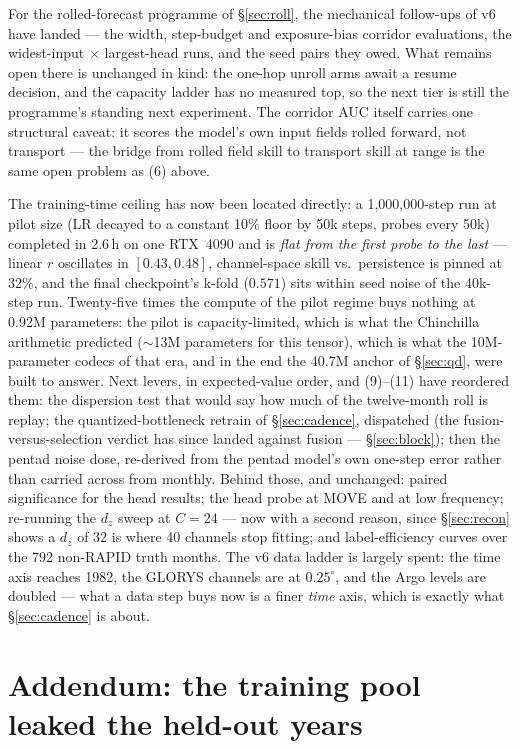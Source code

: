 \documentclass[10pt]{article}
\begin{document}
For the rolled-forecast programme of \S\ref{sec:roll}, the mechanical
follow-ups of v6 have landed --- the width, step-budget and exposure-bias
corridor evaluations, the widest-input $\times$ largest-head runs, and the
seed pairs they owed. What remains open there is unchanged in kind: the
one-hop unroll arms await a resume decision, and the capacity ladder has no
measured top, so the next tier is still the programme's standing next
experiment. The corridor AUC itself carries
one structural caveat: it scores the model's own input fields rolled
forward, not transport --- the bridge from rolled field skill to
transport skill at range is the same open problem as (6) above.

The training-time ceiling has now been located directly: a
1,000,000-step run at pilot size (LR decayed to a constant 10\% floor by
50k steps, probes every 50k) completed in 2.6\,h on one RTX~4090 and is
\emph{flat from the first probe to the last} --- linear $r$ oscillates
in $[0.43, 0.48]$, channel-space skill vs.\ persistence is pinned at
$32\%$, and the final checkpoint's k-fold ($0.571$) sits within seed
noise of the 40k-step run. Twenty-five times the compute of the pilot
regime buys nothing at 0.92M parameters: the pilot is capacity-limited,
which is what the Chinchilla arithmetic predicted ($\sim$13M parameters
for this tensor), which is what the 10M-parameter codecs of that era, and
in the end the 40.7M anchor of \S\ref{sec:qd}, were built to answer.
Next levers, in expected-value order, and (9)--(11) have reordered them:
the dispersion test that would say how much of the twelve-month roll is
replay; the quantized-bottleneck
retrain of \S\ref{sec:cadence}, dispatched (the fusion-versus-selection
verdict has since landed against fusion --- \S\ref{sec:block}); then the pentad noise
dose, re-derived from the pentad model's own one-step error rather than
carried across from monthly. Behind those, and unchanged: paired
significance for the head results; the head
probe at MOVE and at low frequency; re-running the $d_z$ sweep at
$C{=}24$ --- now with a second reason, since \S\ref{sec:recon} shows a
$d_z$ of 32 is where 40 channels stop fitting; and label-efficiency curves
over the 792 non-RAPID truth months. The v6 data ladder is largely spent:
the time axis reaches 1982, the GLORYS channels are at $0.25^\circ$, and
the Argo levels are doubled --- what a data step buys now is a finer
\emph{time} axis, which is exactly what \S\ref{sec:cadence} is about.

\section{Addendum: the training pool leaked the held-out years}\label{sec:contamination}
\end{document}
